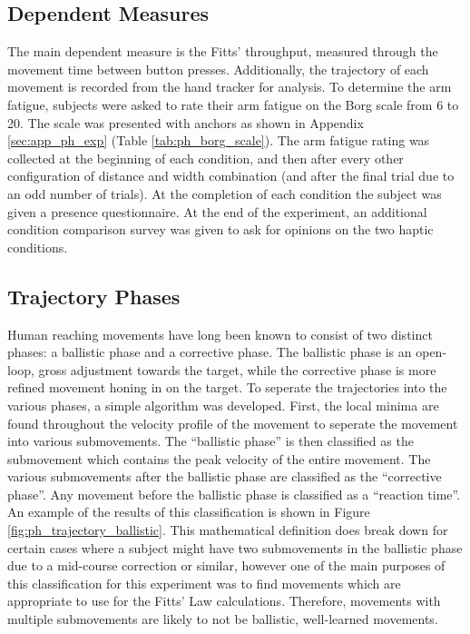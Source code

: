 \subsection{Dependent Measures}

The main dependent measure is the Fitts' throughput, measured through the movement time between button presses.
Additionally, the trajectory of each movement is recorded from the hand tracker for analysis.
To determine the arm fatigue, subjects were asked to rate their arm fatigue on the Borg scale from 6 to 20.
The scale was presented with anchors as shown in Appendix \ref{sec:app_ph_exp} (Table \ref{tab:ph_borg_scale}).
The arm fatigue rating was collected at the beginning of each condition, and then after every other configuration of distance and width combination (and after the final trial due to an odd number of trials).
At the completion of each condition the subject was given a presence questionnaire.
At the end of the experiment, an additional condition comparison survey was given to ask for opinions on the two haptic conditions.

\subsection{Trajectory Phases}
\label{sec:ph_traj_phases}

Human reaching movements have long been known to consist of two distinct phases\cite{woodworth_accuracy_1899}: a ballistic phase and a corrective phase.
The ballistic phase is an open-loop, gross adjustment towards the target, while the corrective phase is more refined movement honing in on the target.
To seperate the trajectories into the various phases, a simple algorithm was developed.
First, the local minima are found throughout the velocity profile of the movement to seperate the movement into various submovements.
The ``ballistic phase'' is then classified as the submovement which contains the peak velocity of the entire movement.
The various submovements after the ballistic phase are classified as the ``corrective phase''.
Any movement before the ballistic phase is classified as a ``reaction time''.
An example of the results of this classification is shown in Figure \ref{fig:ph_trajectory_ballistic}.
This mathematical definition does break down for certain cases where a subject might have two submovements in the ballistic phase due to a mid-course correction or similar, however one of the main purposes of this classification for this experiment was to find movements which are appropriate to use for the Fitts' Law calculations.
Therefore, movements with multiple submovements are likely to not be ballistic, well-learned movements.


